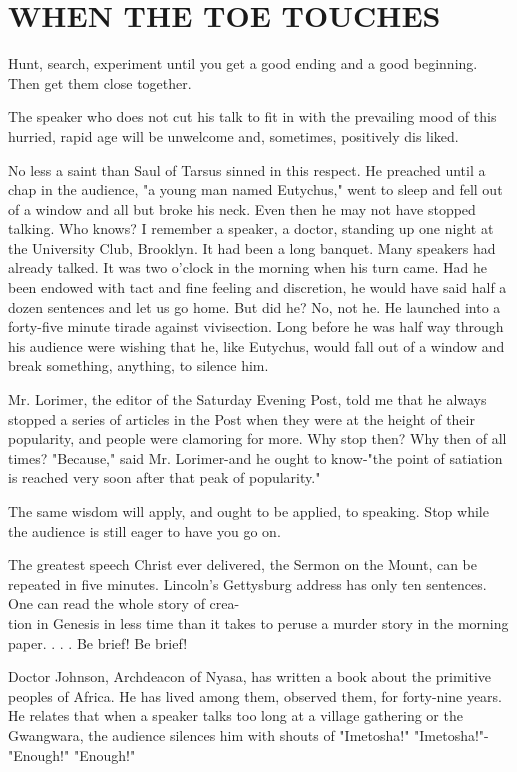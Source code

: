 \documentclass[10pt]{article}
\begin{document}
\section*{WHEN THE TOE TOUCHES}
Hunt, search, experiment until you get a good ending and a good beginning. Then get them close together.

The speaker who does not cut his talk to fit in with the prevailing mood of this hurried, rapid age will be unwelcome and, sometimes, positively dis liked.

No less a saint than Saul of Tarsus sinned in this respect. He preached until a chap in the audience, "a young man named Eutychus," went to sleep and fell out of a window and all but broke his neck. Even then he may not have stopped talking. Who knows? I remember a speaker, a doctor, standing up one night at the University Club, Brooklyn. It had been a long banquet. Many speakers had already talked. It was two o'clock in the morning when his turn came. Had he been endowed with tact and fine feeling and discretion, he would have said half a dozen sentences and let us go home. But did he? No, not he. He launched into a forty-five minute tirade against vivisection. Long before he was half way through his audience were wishing that he, like Eutychus, would fall out of a window and break something, anything, to silence him.

Mr. Lorimer, the editor of the Saturday Evening Post, told me that he always stopped a series of articles in the Post when they were at the height of their popularity, and people were clamoring for more. Why stop then? Why then of all times? "Because," said Mr. Lorimer-and he ought to know-"the point of satiation is reached very soon after that peak of popularity."

The same wisdom will apply, and ought to be applied, to speaking. Stop while the audience is still eager to have you go on.

The greatest speech Christ ever delivered, the Sermon on the Mount, can be repeated in five minutes. Lincoln's Gettysburg address has only ten sentences. One can read the whole story of crea-\\
tion in Genesis in less time than it takes to peruse a murder story in the morning paper. . . . Be brief! Be brief!

Doctor Johnson, Archdeacon of Nyasa, has written a book about the primitive peoples of Africa. He has lived among them, observed them, for forty-nine years. He relates that when a speaker talks too long at a village gathering or the Gwangwara, the audience silences him with shouts of "Imetosha!" "Imetosha!"-"Enough!" "Enough!"
\end{document}
